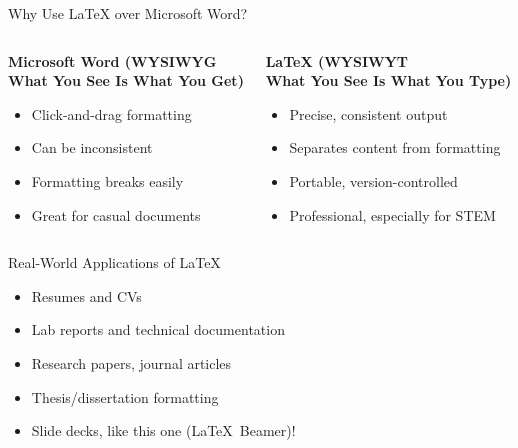 \documentclass[x11names]{beamer} %
\begin{document}
\begin{frame}{Why Use \LaTeX{} over Microsoft Word?}
    \begin{columns}[t] %
        \begin{column}{0.48\textwidth}
        \textbf{Microsoft Word (WYSIWYG\\[0.1em] \scriptsize{What You See Is What You Get})}
        \begin{itemize}
            \item Click-and-drag formatting
            \item Can be inconsistent
            \item Formatting breaks easily
            \item Great for casual documents
        \end{itemize}
        \end{column}
        \begin{column}{0.48\textwidth}
        \textbf{\LaTeX{} (WYSIWYT\\[0.1em] \scriptsize{What You See Is What You Type})}
        \begin{itemize}
            \item Precise, consistent output
            \item Separates content from formatting
            \item Portable, version-controlled
            \item Professional, especially for STEM
        \end{itemize}
        \end{column}
    \end{columns}
    \end{frame}    

\begin{frame}{Real-World Applications of \LaTeX}
\begin{itemize}
    \item Resumes and CVs
    \item Lab reports and technical documentation
    \item Research papers, journal articles
    \item Thesis/dissertation formatting
    \item Slide decks, like this one (\LaTeX\ Beamer)!
\end{itemize}
\end{frame}
\end{document}
